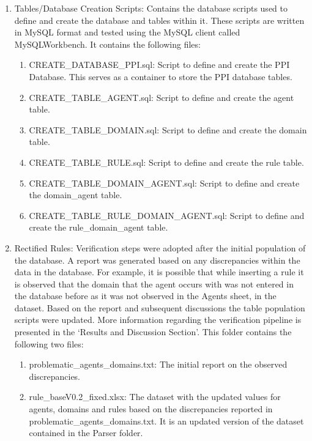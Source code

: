 \documentclass[msc,deptreport,ai]{infthesis}      %
\begin{document}
\begin{enumerate}
 	\item Tables/Database Creation Scripts: Contains the database scripts used to define and create the database and tables within it. These scripts are written in MySQL format and tested using the MySQL client called MySQLWorkbench. It contains the following files:
 	 	 	\begin{enumerate}
 		\item CREATE\_DATABASE\_PPI.sql: Script to define and create the PPI Database. This serves as a container to store the PPI database tables.
 		\item CREATE\_TABLE\_AGENT.sql: Script to define and create the agent table.
 		\item CREATE\_TABLE\_DOMAIN.sql: Script to define and create the domain table.
 		\item CREATE\_TABLE\_RULE.sql: Script to define and create the rule table.
 		\item CREATE\_TABLE\_DOMAIN\_AGENT.sql: Script to define and create the domain\_agent table.
 		\item CREATE\_TABLE\_RULE\_DOMAIN\_AGENT.sql:  Script to define and create the rule\_domain\_agent table.
 	\end{enumerate}
 
 \item Rectified Rules:  Verification steps were adopted after the initial population of the database. A report was generated based on any discrepancies within the data in the database. For example, it is possible that while inserting a rule it is observed that the domain that the agent occurs with was not entered in the database before as it was not observed in the Agents sheet, in the dataset. Based on the report and subsequent discussions the table population scripts were updated. More information regarding the verification pipeline is presented in the `Results and Discussion Section'. This folder contains the following two files:
    \begin{enumerate}
   	\item problematic\_agents\_domains.txt: The initial report on the observed discrepancies.
   	\item rule\_baseV0.2\_fixed.xlsx: The dataset with the updated values for agents, domains and rules based on the discrepancies reported in\\ problematic\_agents\_domains.txt. It is an updated version of the dataset contained in the Parser folder.
   \end{enumerate}
 \end{enumerate}
	
\end{document}

